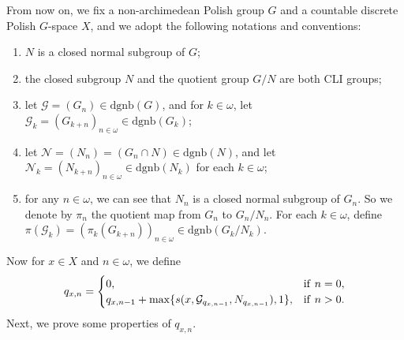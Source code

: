 \documentclass[11pt]{amsart}
\newtheorem{lemma}[theorem]{Lemma}
\theoremstyle{definition}
\theoremstyle{remark}
\numberwithin{equation}{section}
\def\dgnb{{\mathrm{dgnb}}}
\def\itx#1{{\mbox{\textrm{ #1 }}}}
\def\itxl#1{{\mbox{\textrm{#1 }}}}
\begin{document}
From now on, we fix a non-archimedean Polish group $G$ and a countable discrete Polish $G$-space $X$, and we adopt the following notations and conventions:
\begin{enumerate}
    \item[(a)] $N$ is a closed normal subgroup of $G$;
    \item[(b)] the closed subgroup $N$ and the quotient group $G/N$ are both CLI groups;
    \item[(c)] let $\mathcal{G}=(G_n)\in\dgnb(G)$, and for $k\in\omega$, let $\mathcal{G}_k=(G_{k+n})_{n\in\omega}\in\dgnb(G_k)$;
    \item[(d)] let $\mathcal{N}=(N_n)=(G_n\cap N)\in\dgnb(N)$, and let $\mathcal{N}_k=(N_{k+n})_{n\in\omega}\in\dgnb(N_k)$ for each $k\in\omega$;
    \item[(e)] for any $n\in\omega$, we can see that $N_n$ is a closed normal subgroup of $G_n$. So we denote by $\pi_n$ the quotient map from $G_n$ to $G_n/N_n$. For each $k\in\omega$, define $\pi(\mathcal{G}_k)=(\pi_k(G_{k+n}))_{n\in\omega}\in\dgnb(G_k/N_k)$.
\end{enumerate}

Now for $x\in X$ and $n\in\omega$, we define
\begin{equation*}
    q_{x,n}=\begin{cases}
        0,&\itxl{if}n=0,\\
        q_{x,n-1}+\max\{s(x,\mathcal{G}_{q_{x,n-1}},N_{q_{x,n-1}}),1\},&\itxl{if}n>0.
    \end{cases}
\end{equation*}
Next, we prove some properties of $q_{x,n}$.

\end{document}
